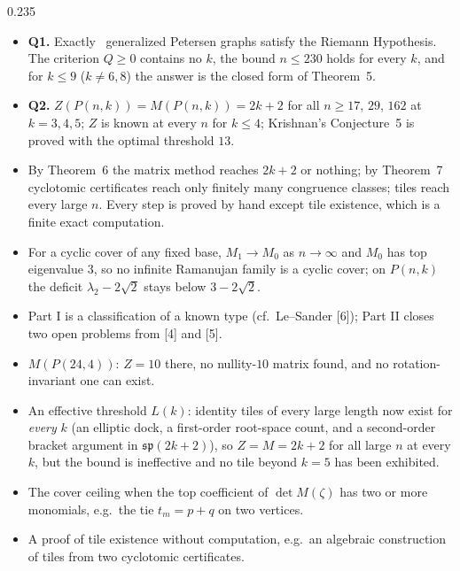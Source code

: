 \documentclass[final]{beamer}
\newenvironment{card}[1]{\begin{tcolorbox}[colback=white,colframe=white,boxrule=0pt,arc=10pt,
   left=10pt,right=10pt,top=10pt,bottom=12pt,boxsep=0pt,before skip=16pt,after skip=0pt,
   title={#1},fonttitle=\Large\bfseries\titlefont,colbacktitle=ink,coltitle=white,halign title=center,
   toptitle=7pt,bottomtitle=7pt]}{\end{tcolorbox}}
\begin{document}
\begin{frame}[t]
\begin{columns}[t,onlytextwidth]
\begin{column}{0.235\textwidth}
\begin{colwrap}
\begin{upper}
\begin{card}{Discussion}
\end{card}
\begin{card}{Conclusions}
\begin{itemize}\itemsep2pt
\item \textbf{Q1.} Exactly \RamAllTotal\ generalized Petersen graphs satisfy the Riemann Hypothesis. The criterion $Q\ge0$ contains no $k$, the bound $n\le230$ holds for every $k$, and for $k\le9$ ($k\ne6,8$) the answer is the closed form of Theorem~5.
\item \textbf{Q2.} $Z(P(n,k))=M(P(n,k))=2k+2$ for all $n\ge17$, $29$, $162$ at $k=3,4,5$; $Z$ is known at every $n$ for $k\le4$; Krishnan's Conjecture~5 is proved with the optimal threshold $13$.
\item By Theorem~6 the matrix method reaches $2k+2$ or nothing; by Theorem~7 cyclotomic certificates reach only finitely many congruence classes; tiles reach every large $n$. Every step is proved by hand except tile existence, which is a finite exact computation.
\item For a cyclic cover of any fixed base, $M_1\to M_0$ as $n\to\infty$ and $M_0$ has top eigenvalue $3$, so no infinite Ramanujan family is a cyclic cover; on $P(n,k)$ the deficit $\lambda_2-2\sqrt2$ stays below $3-2\sqrt2$.
\item Part I is a classification of a known type (cf.\ Le--Sander [6]); Part II closes two open problems from [4] and [5].
\end{itemize}
\end{card}
\begin{card}{Open problems}
\begin{itemize}\itemsep2pt
\item $M(P(24,4))$: $Z=10$ there, no nullity-$10$ matrix found, and no rotation-invariant one can exist.
\item An effective threshold $L(k)$: identity tiles of every large length now exist for \emph{every} $k$ (an elliptic dock, a first-order root-space count, and a second-order bracket argument in $\mathfrak{sp}(2k+2)$), so $Z=M=2k+2$ for all large $n$ at every $k$, but the bound is ineffective and no tile beyond $k=5$ has been exhibited.
\item The cover ceiling when the top coefficient of $\det M(\zeta)$ has two or more monomials, e.g.\ the tie $t_m=p+q$ on two vertices.
\item A proof of tile existence without computation, e.g.\ an algebraic construction of tiles from two cyclotomic certificates.
\end{itemize}

\end{card}
\end{upper}
\end{colwrap}
\end{column}
\end{columns}
\end{frame}
\end{document}
